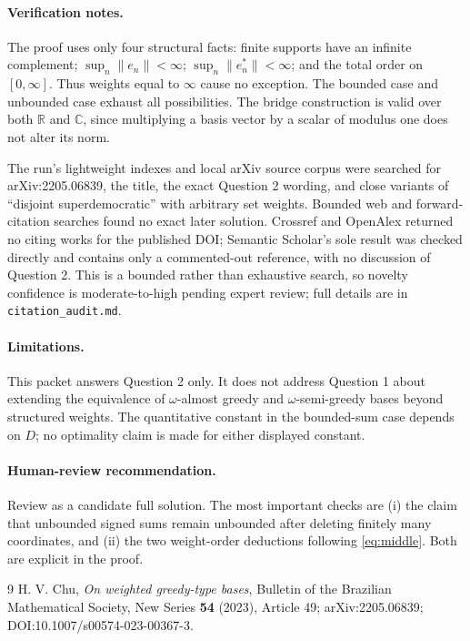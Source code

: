 \documentclass[11pt]{article}
\begin{document}
\paragraph{Verification notes.}
The proof uses only four structural facts: finite supports have an infinite
complement; \(\sup_n\|e_n\|<\infty\); \(\sup_n\|e_n^*\|<\infty\); and the
total order on \([0,\infty]\). Thus weights equal to \(\infty\) cause no
exception. The bounded case and unbounded case exhaust all possibilities.
The bridge construction is valid over both \(\mathbb R\) and \(\mathbb C\),
since multiplying a basis vector by a scalar of modulus one does not alter
its norm.

The run's lightweight indexes and local arXiv source corpus were searched
for arXiv:2205.06839, the title, the exact Question 2 wording, and close
variants of ``disjoint superdemocratic'' with arbitrary set weights. Bounded
web and forward-citation searches found no exact later solution. Crossref and
OpenAlex returned no citing works for the published DOI; Semantic Scholar's
sole result was checked directly and contains only a commented-out reference,
with no discussion of Question 2. This is a bounded rather than exhaustive
search, so novelty confidence is moderate-to-high pending expert review; full
details are in \texttt{citation\_audit.md}.

\paragraph{Limitations.}
This packet answers Question 2 only. It does not address Question 1 about
extending the equivalence of \(\omega\)-almost greedy and
\(\omega\)-semi-greedy bases beyond structured weights. The quantitative
constant in the bounded-sum case depends on \(D\); no optimality claim is
made for either displayed constant.

\paragraph{Human-review recommendation.}
Review as a candidate full solution. The most important checks are (i) the
claim that unbounded signed sums remain unbounded after deleting finitely many
coordinates, and (ii) the two weight-order deductions following
\eqref{eq:middle}. Both are explicit in the proof.

\begin{thebibliography}{9}
H. V. Chu,
\emph{On weighted greedy-type bases},
Bulletin of the Brazilian Mathematical Society, New Series \textbf{54}
(2023), Article 49; arXiv:2205.06839; DOI:10.1007/s00574-023-00367-3.
\end{thebibliography}
\end{document}
